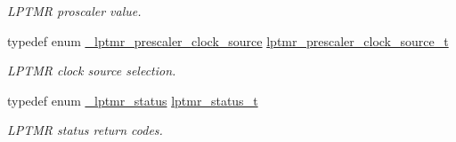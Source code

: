 \begin{DoxyCompactItemize}
\begin{DoxyCompactList}\small\item\em L\+P\+T\+MR proscaler value. \end{DoxyCompactList}\item 
typedef enum \hyperlink{group__lptmr__hal_ga8dd7b1ea8d5d91a6ff3b167d85e54acf}{\+\_\+lptmr\+\_\+prescaler\+\_\+clock\+\_\+source} \hyperlink{group__lptmr__hal_ga3ff6f64c0b021e2cb03f7980f258beea}{lptmr\+\_\+prescaler\+\_\+clock\+\_\+source\+\_\+t}\hypertarget{group__lptmr__hal_ga3ff6f64c0b021e2cb03f7980f258beea}{}\label{group__lptmr__hal_ga3ff6f64c0b021e2cb03f7980f258beea}

\begin{DoxyCompactList}\small\item\em L\+P\+T\+MR clock source selection. \end{DoxyCompactList}\item 
typedef enum \hyperlink{group__lptmr__hal_gaa52fc547656e966381f441688c605210}{\+\_\+lptmr\+\_\+status} \hyperlink{group__lptmr__hal_ga65b2bc8500cf2c7544237e50cd9cc27e}{lptmr\+\_\+status\+\_\+t}\hypertarget{group__lptmr__hal_ga65b2bc8500cf2c7544237e50cd9cc27e}{}\label{group__lptmr__hal_ga65b2bc8500cf2c7544237e50cd9cc27e}

\begin{DoxyCompactList}\small\item\em L\+P\+T\+MR status return codes. \end{DoxyCompactList}\end{DoxyCompactItemize}
